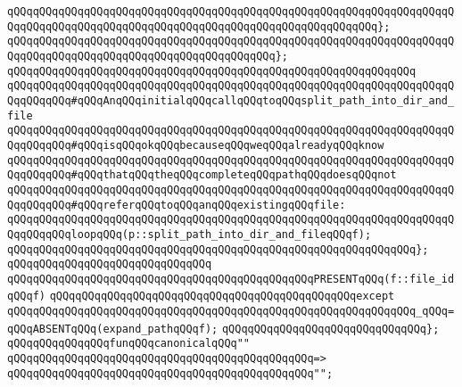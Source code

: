 \verb|qQQqqQQqqQQqqQQqqQQqqQQqqQQqqQQqqQQqqQQqqQQqqQQqqQQqqQQqqQQqqQQqqQQqqQQqqQQqqQQqqQQqqQQqqQQqqQQqqQQqqQQqqQQqqQQqqQQqqQQqqQQqqQQq};|\newline
\verb|qQQqqQQqqQQqqQQqqQQqqQQqqQQqqQQqqQQqqQQqqQQqqQQqqQQqqQQqqQQqqQQqqQQqqQQqqQQqqQQqqQQqqQQqqQQqqQQqqQQqqQQqqQQqqQQq};|\newline
\verb|qQQqqQQqqQQqqQQqqQQqqQQqqQQqqQQqqQQqqQQqqQQqqQQqqQQqqQQqqQQqqQQq|\newline
\newline
\verb|qQQqqQQqqQQqqQQqqQQqqQQqqQQqqQQqqQQqqQQqqQQqqQQqqQQqqQQqqQQqqQQqqQQqqQQqqQQqqQQq#qQQqAnqQQqinitialqQQqcallqQQqtoqQQqsplit_path_into_dir_and_file|\newline
\verb|qQQqqQQqqQQqqQQqqQQqqQQqqQQqqQQqqQQqqQQqqQQqqQQqqQQqqQQqqQQqqQQqqQQqqQQqqQQqqQQq#qQQqisqQQqokqQQqbecauseqQQqweqQQqalreadyqQQqknow|\newline
\verb|qQQqqQQqqQQqqQQqqQQqqQQqqQQqqQQqqQQqqQQqqQQqqQQqqQQqqQQqqQQqqQQqqQQqqQQqqQQqqQQq#qQQqthatqQQqtheqQQqcompleteqQQqpathqQQqdoesqQQqnot|\newline
\verb|qQQqqQQqqQQqqQQqqQQqqQQqqQQqqQQqqQQqqQQqqQQqqQQqqQQqqQQqqQQqqQQqqQQqqQQqqQQqqQQq#qQQqreferqQQqtoqQQqanqQQqexistingqQQqfile:|\newline
\newline
\verb|qQQqqQQqqQQqqQQqqQQqqQQqqQQqqQQqqQQqqQQqqQQqqQQqqQQqqQQqqQQqqQQqqQQqqQQqqQQqqQQqloopqQQq(p::split_path_into_dir_and_fileqQQqf);|\newline
\verb|qQQqqQQqqQQqqQQqqQQqqQQqqQQqqQQqqQQqqQQqqQQqqQQqqQQqqQQqqQQqqQQq};|\newline
\verb|qQQqqQQqqQQqqQQqqQQqqQQqqQQqqQQq|\newline
\verb|qQQqqQQqqQQqqQQqqQQqqQQqqQQqqQQqqQQqqQQqqQQqqQQqPRESENTqQQq(f::file_idqQQqf)|\newline
\verb|qQQqqQQqqQQqqQQqqQQqqQQqqQQqqQQqqQQqqQQqqQQqqQQqexcept|\newline
\verb|qQQqqQQqqQQqqQQqqQQqqQQqqQQqqQQqqQQqqQQqqQQqqQQqqQQqqQQqqQQqqQQq_qQQq=qQQqABSENTqQQq(expand_pathqQQqf);|\newline
\verb|qQQqqQQqqQQqqQQqqQQqqQQqqQQqqQQq};|\newline
\newline
\newline
\verb|qQQqqQQqqQQqqQQqfunqQQqcanonicalqQQq""|\newline
\verb|qQQqqQQqqQQqqQQqqQQqqQQqqQQqqQQqqQQqqQQqqQQqqQQq=>|\newline
\verb|qQQqqQQqqQQqqQQqqQQqqQQqqQQqqQQqqQQqqQQqqQQqqQQq"";|\newline
